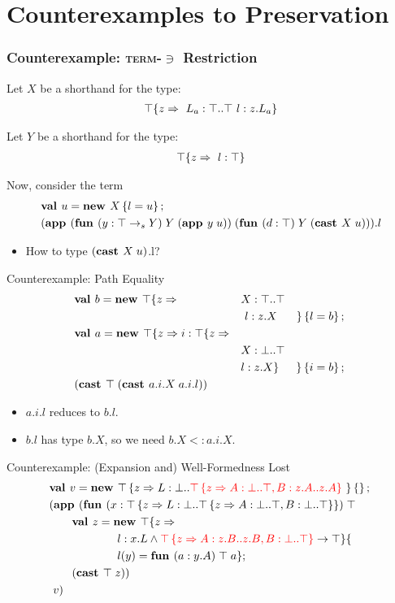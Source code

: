 \documentclass{beamer}
\begin{document}
\section{Counterexamples to Preservation}

\begin{frame}[fragile]
\frametitle{Counterexample: \texorpdfstring{\textsc{term-$\ni$}}{Term-Mem} Restriction}
Let $X$ be a shorthand for the type:
\begin{align*}
\top \{z \Rightarrow 
\ L_a : \top..\top
\ l : z.L_a
 \}
\end{align*}

Let $Y$ be a shorthand for the type:
\begin{align*}
\top \{z \Rightarrow 
\ l : \top
 \}
\end{align*}

Now, consider the term
\begin{align*}
&\mlnew u {X \ldefs{ l = u }}{
\app {(\fun y {\arrow \Top Y} {Y} {\app y u})} {(\fun d \Top Y {\cast X u})}.l
}
\end{align*}

\begin{itemize}
\item How to type ${(\textbf{cast }X\;u)}$.l?
\end{itemize}
\end{frame}

\begin{frame}[fragile]{Counterexample: Path Equality}
\begin{align*}
&\textbf{val }b = \textbf{new }\top \{z \Rightarrow &&X : \top..\top&\\
&&&\ l : z.X& \}\left\{l = b\right\} ;\;\\&
\textbf{val }a = \textbf{new }\top \{z \Rightarrow i : \top \{z \Rightarrow &&&\\
&&&X : \bot..\top\\
&&&l : z.X \}& \}\left\{i = b\right\} ;\;\\&
{(\textbf{cast }\top\;(\textbf{cast }a.i.X\;a.i.l))}
\end{align*}

\begin{itemize}
\item $a.i.l$ reduces to $b.l$.
\item $b.l$ has type $b.X$, so we need $b.X <: a.i.X$.
\end{itemize}
\end{frame}

\begin{frame}[fragile]{Counterexample: (Expansion and) Well-Formedness Lost}
\begin{align*}
&\textbf{val }v = \textbf{new }\top \left\{z \Rightarrow L : \bot..{\color{red}{\top\left\{z \Rightarrow A : \bot..\top, B : z.A..z.A \right\}}}\  \right\} \left\{\right\} ;\;\\&
(\textbf{app }(\textbf{fun } (x:\top \left\{z \Rightarrow L : \bot..\top \left\{z \Rightarrow A : \bot..\top, B : \bot..\top \right\} \right\})\;\top\;\\&\quad\quad
\textbf{val }z = \textbf{new }\top \{z \Rightarrow \\&\quad\quad\quad\quad\quad\quad
l : x.L \wedge {\color{red}{\top\left\{z \Rightarrow A : z.B..z.B, B : \bot..\top\right\}}} \rightarrow \top \}\{\\&\quad\quad\quad\quad\quad\quad
l(y) = \textbf{fun } (a:y.A)\;\top\;a\} ;\;\\&
\quad\quad (\textbf{cast }\top\;z)
)\;\\&\ v)
\end{align*}
\end{frame}
\end{document}

